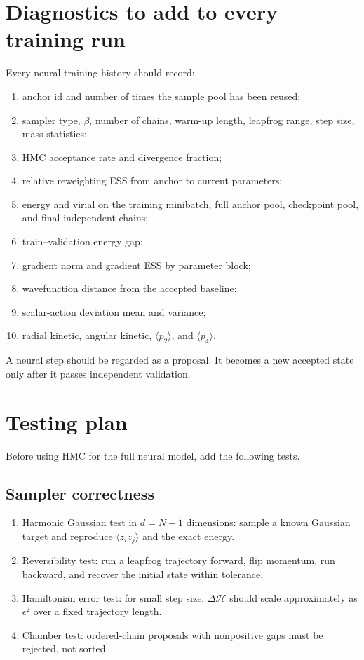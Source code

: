 \documentclass[11pt]{article}
\begin{document}
\section{Diagnostics to add to every training run}

Every neural training history should record:
\begin{enumerate}[label=(\roman*)]
\item anchor id and number of times the sample pool has been reused;
\item sampler type, $\beta$, number of chains, warm-up length, leapfrog range, step size, mass statistics;
\item HMC acceptance rate and divergence fraction;
\item relative reweighting ESS from anchor to current parameters;
\item energy and virial on the training minibatch, full anchor pool, checkpoint pool, and final independent chains;
\item train--validation energy gap;
\item gradient norm and gradient ESS by parameter block;
\item wavefunction distance from the accepted baseline;
\item scalar-action deviation mean and variance;
\item radial kinetic, angular kinetic, $\langle p_2\rangle$, and $\langle p_4\rangle$.
\end{enumerate}
A neural step should be regarded as a proposal.  It becomes a new accepted state only after it passes independent validation.

\section{Testing plan}

Before using HMC for the full neural model, add the following tests.

\subsection{Sampler correctness}
\begin{enumerate}[label=(\roman*)]
\item Harmonic Gaussian test in $d=N-1$ dimensions: sample a known Gaussian target and reproduce $\langle z_iz_j\rangle$ and the exact energy.
\item Reversibility test: run a leapfrog trajectory forward, flip momentum, run backward, and recover the initial state within tolerance.
\item Hamiltonian error test: for small step size, $\Delta\mathcal H$ should scale approximately as $\epsilon^2$ over a fixed trajectory length.
\item Chamber test: ordered-chain proposals with nonpositive gaps must be rejected, not sorted.
\end{enumerate}
\end{document}
